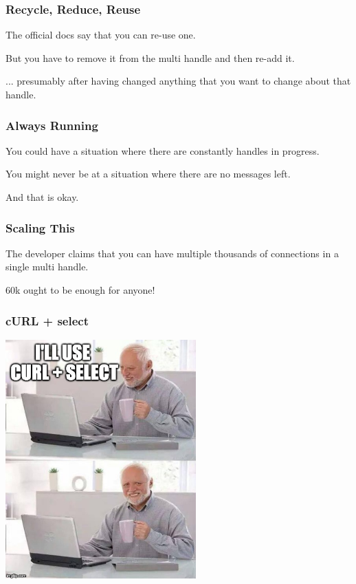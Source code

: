 \begin{frame}
\frametitle{Recycle, Reduce, Reuse}

The official docs say that you can re-use one. 

But you have to remove it from the multi handle and then re-add it.

... presumably after having changed anything that you want to change about that handle.

\end{frame}


\begin{frame}
\frametitle{Always Running}

You could have a situation where there are constantly handles in progress.

You might never be at a situation where there are no messages left. 

And that is okay.

\end{frame}

\begin{frame}
\frametitle{Scaling This}

The developer claims that you can have multiple thousands of connections in a single multi handle.

60k ought to be enough for anyone!
\end{frame}


\begin{frame}
\frametitle{cURL + select}
\begin{center}
	\includegraphics[width=0.55\textwidth]{images/harold.jpg}
\end{center}


\end{frame}


